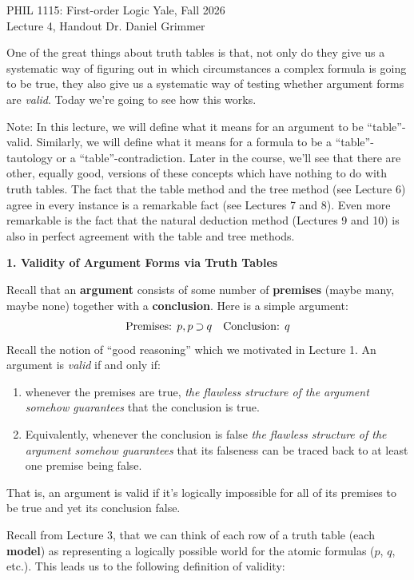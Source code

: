 \documentclass[options]{philosophersimprint}
\theoremstyle{definition}
\begin{document}
PHIL 1115: First-order Logic \hfill Yale, Fall 2026\\
Lecture 4, Handout \hfill Dr. Daniel Grimmer

One of the great things about truth tables is that, not only do they give us a systematic way of figuring out in which circumstances a complex formula is going to be true, they also give us a systematic way of testing whether argument forms are \textit{valid}. Today we're going to see how this works.

Note: In this lecture, we will define what it means for an argument to be ``table''-valid. Similarly, we will define what it means for a formula to be a ``table''-tautology or a ``table''-contradiction. Later in the course, we'll see that there are other, equally good, versions of these concepts which have nothing to do with truth tables. The fact that the table method and the tree method (see Lecture 6) agree in every instance is a remarkable fact (see Lectures 7 and 8). Even more remarkable is the fact that the natural deduction method (Lectures 9 and 10) is also in perfect agreement with the table and tree methods.

\textbf{1. Validity of Argument Forms via Truth Tables}

Recall that an \textbf{argument} consists of some number of \textbf{premises} (maybe many, maybe none) together with a \textbf{conclusion}. Here is a simple argument:
$$\text{Premises: } p, p \mathbin{\supset} q \quad \text{Conclusion: }q$$
Recall the notion of ``good reasoning'' which we motivated in Lecture 1. An argument is \textit{valid} if and only if:
\begin{enumerate}
    \item whenever the premises are true, \textit{the flawless structure of the argument somehow guarantees} that the conclusion is true.
    \item Equivalently, whenever the conclusion is false \textit{the flawless structure of the argument somehow guarantees} that its falseness can be traced back to at least one premise being false.
\end{enumerate}
That is, an argument is valid if it's logically impossible for all of its premises to be true and yet its conclusion false.

Recall from Lecture 3, that we can think of each row of a truth table (each \textbf{model}) as representing a logically possible world for the atomic formulas ($p$, $q$, etc.). This leads us to the following definition of validity:
\end{document}
